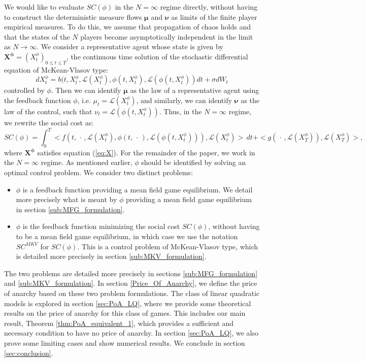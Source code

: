 \documentclass[11pt]{article}
\def\bmu{\boldsymbol{\mu}}
\def\bnu{\boldsymbol{\nu}}
\newcommand\cL{\mathcal L}
\begin{document}
We would like to evaluate $SC(\phi)$ in the $N=\infty$ regime directly, without having to construct the deterministic measure flows $\bmu$ and $\bnu$ as limits of the finite player empirical measures. To do this, we assume that propagation of chaos holds and that the states of the $N$ players become asymptotically independent in the limit as $N \rightarrow \infty$. We consider a representative agent whose state is given by $\boldsymbol{X^{\phi}}=(X^{\phi}_t)_{0 \leq t \leq T}$, the continuous time solution of the stochastic differential equation of McKean-Vlasov type:
\begin{equation}
    dX^{\phi}_t=b(t,X^{\phi}_t,\cL(X^{\phi}_t),\phi(t,X^{\phi}_t),\cL(\phi(t,X^{\phi}_t))dt+\sigma dW_t
\label{eq:X}
\end{equation}
controlled by $\phi$. Then we can identify $\bmu$ as the law of a representative agent using the feedback function $\phi$, i.e. $\mu_t=\cL(X^{\phi}_t)$, and similarly, we can identify $\bnu$ as the law of the control, such that $\nu_t=\cL(\phi(t,X^{\phi}_t))$. Thus, in the $N=\infty$ regime, we rewrite the social cost as:
\begin{equation*}
SC(\phi)=\int_0^T<f(t,\,\cdot\,,\cL(X^{\phi}_t),\phi(t,\,\cdot\,),\cL(\phi(t,X^{\phi}_t))),\cL(X^{\phi}_t)>\,dt+<g(\,\cdot\,,\cL(X^{\phi}_T)),\cL(X^{\phi}_T)>,
\end{equation*}
where $\boldsymbol{X^{\phi}}$ satisfies equation (\ref{eq:X}). For the remainder of the paper, we work in the $N=\infty$ regime. As mentioned earlier, $\phi$ should be identified by solving an optimal control problem. We consider two distinct problems:
\begin{itemize}\itemsep=-2pt
\item $\phi$ is a feedback function providing a mean field game equilibrium. We detail more precisely what is meant by $\phi$ providing a mean field game equilibrium in section \ref{sub:MFG_formulation}.
\item $\phi$ is the feedback function minimizing the social cost $SC(\phi)$, without having to be a mean field game equilibrium, in which case we use the notation $SC^{MKV}$ for $SC(\phi)$. This is a control problem of McKean-Vlasov type, which is detailed more precisely in section \ref{sub:MKV_formulation}.
\end{itemize}
The two problems are detailed more precisely in sections \ref{sub:MFG_formulation} and \ref{sub:MKV_formulation}. In section \ref{Price_Of_Anarchy}, we define the price of anarchy based on these two problem formulations. The class of linear quadratic models is explored in section \ref{sec:PoA_LQ}, where we provide some theoretical results on the price of anarchy for this class of games. This includes our main result, Theorem \ref{thm:PoA_equivalent_1}, which provides a sufficient and necessary condition to have no price of anarchy. In section \ref{sec:PoA_LQ}, we also prove some limiting cases and show numerical results. We conclude in section \ref{sec:conclusion}.
\end{document}
